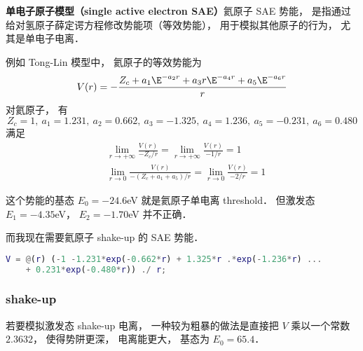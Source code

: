 
\textbf{单电子原子模型（single active electron SAE）}氦原子 SAE 势能， 是指通过给对氢原子薛定谔方程修改势能项（等效势能）， 用于模拟其他原子的行为， 尤其是单电子电离．

例如 Tong-Lin 模型中， 氦原子的等效势能为
\begin{equation}
V(r) = -\frac{Z_c + a_1 \E^{-a_2 r} + a_3 r \E^{-a_4 r} + a_5 \E^{-a_6 r}}{r}
\end{equation}
对氦原子， 有
\begin{equation}
Z_c = 1, \ a_1 = 1.231,\ a_2 = 0.662,\ a_3 = -1.325,\ a_4 = 1.236,\ a_5 = -0.231,\ a_6 = 0.480
\end{equation}
满足
\begin{align}
&\lim_{r\to +\infty} \frac{V(r)}{-Z_c/r} = \lim_{r\to +\infty} \frac{V(r)}{-1/r} = 1\\
&\lim_{r\to 0} \frac{V(r)}{-(Z_c + a_1 + a_5)/r} = \lim_{r\to 0} \frac{V(r)}{-2/r} = 1
\end{align}

这个势能的基态 $E_0 = -24.6$eV 就是氦原子单电离 threshold． 但激发态 $E_1 = -4.35$eV， $E_2 = -1.70$eV 并不正确．

而我现在需要氦原子 shake-up 的 SAE 势能．

\begin{lstlisting}[language=matlab]
V = @(r) (-1 -1.231*exp(-0.662*r) + 1.325*r .*exp(-1.236*r) ...
    + 0.231*exp(-0.480*r)) ./ r;
\end{lstlisting}

\subsubsection{shake-up}
若要模拟激发态 shake-up 电离， 一种较为粗暴的做法是直接把 $V$ 乘以一个常数 $2.3632$， 使得势阱更深， 电离能更大， 基态为 $E_0 = 65.4$．
